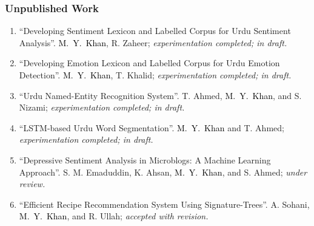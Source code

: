 \documentclass[a4paper, 10pt]{article}
\begin{document}
\subsubsection*{{ Unpublished Work}}
\begin{enumerate}[U\arabic*.] 
\itemsep = 0em

\item ``Developing Sentiment Lexicon and Labelled Corpus for Urdu Sentiment Analysis''. \textcolor{Black}{M.~Y.~Khan}, R. Zaheer; \emph{\small experimentation completed; in draft.}

\item ``Developing Emotion Lexicon and Labelled Corpus for Urdu Emotion Detection''. \textcolor{Black}{M.~Y.~Khan}, T. Khalid; \emph{\small experimentation completed; in draft.}

\item ``Urdu Named-Entity Recognition System''. T. Ahmed, \textcolor{Black}{M.~Y.~Khan}, and S. Nizami; \emph{\small experimentation completed; in draft.}

\item ``LSTM-based Urdu Word Segmentation''. \textcolor{Black}{M.~Y.~Khan} and T. Ahmed; \emph{\small experimentation completed; in draft.}

\item ``Depressive Sentiment Analysis in Microblogs: A Machine Learning Approach''. S. M. Emaduddin, K. Ahsan, \textcolor{Black}{M.~Y.~Khan}, and S. Ahmed; \emph{\small under review.}

\item ``Efficient Recipe Recommendation System Using Signature-Trees''. A. Sohani, \textcolor{Black}{M.~Y.~Khan}, and R. Ullah;
\emph{\small accepted with revision.}




\end{enumerate}
\end{document}
